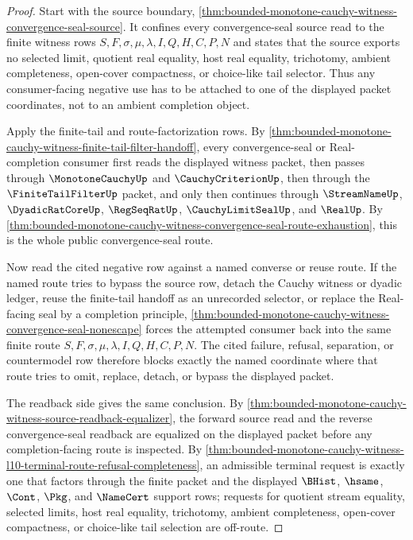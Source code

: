 \begin{proof}
Start with the source boundary, \autoref{thm:bounded-monotone-cauchy-witness-convergence-seal-source}. It confines every convergence-seal source read to the finite witness rows $S,F,\sigma,\mu,\lambda,I,Q,H,C,P,N$ and states that the source exports no selected limit, quotient real equality, host real equality, trichotomy, ambient completeness, open-cover compactness, or choice-like tail selector. Thus any consumer-facing negative use has to be attached to one of the displayed packet coordinates, not to an ambient completion object.

Apply the finite-tail and route-factorization rows. By \autoref{thm:bounded-monotone-cauchy-witness-finite-tail-filter-handoff}, every convergence-seal or Real-completion consumer first reads the displayed witness packet, then passes through $\MonotoneCauchyUp$ and $\CauchyCriterionUp$, then through the $\FiniteTailFilterUp$ packet, and only then continues through $\StreamNameUp$, $\DyadicRatCoreUp$, $\RegSeqRatUp$, $\CauchyLimitSealUp$, and $\RealUp$. By \autoref{thm:bounded-monotone-cauchy-witness-convergence-seal-route-exhaustion}, this is the whole public convergence-seal route.

Now read the cited negative row against a named converse or reuse route. If the named route tries to bypass the source row, detach the Cauchy witness or dyadic ledger, reuse the finite-tail handoff as an unrecorded selector, or replace the Real-facing seal by a completion principle, \autoref{thm:bounded-monotone-cauchy-witness-convergence-seal-nonescape} forces the attempted consumer back into the same finite route $S,F,\sigma,\mu,\lambda,I,Q,H,C,P,N$. The cited failure, refusal, separation, or countermodel row therefore blocks exactly the named coordinate where that route tries to omit, replace, detach, or bypass the displayed packet.

The readback side gives the same conclusion. By \autoref{thm:bounded-monotone-cauchy-witness-source-readback-equalizer}, the forward source read and the reverse convergence-seal readback are equalized on the displayed packet before any completion-facing route is inspected. By \autoref{thm:bounded-monotone-cauchy-witness-l10-terminal-route-refusal-completeness}, an admissible terminal request is exactly one that factors through the finite packet and the displayed $\BHist$, $\hsame$, $\Cont$, $\Pkg$, and $\NameCert$ support rows; requests for quotient stream equality, selected limits, host real equality, trichotomy, ambient completeness, open-cover compactness, or choice-like tail selection are off-route.


\end{proof}

